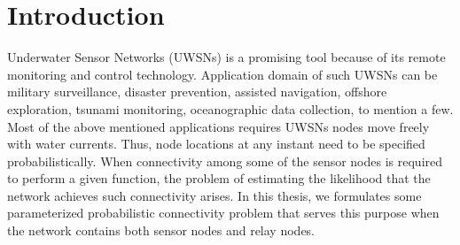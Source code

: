 \documentclass[12pt]{article}
\begin{document}
\newcommand {\nwline}   {\hfill\break}
\newcommand {\closeup}  {\vspace*{-0.2in}}
\newcommand {\hLine}[1] {\begin{center}\rule{#1}{0.25mm}\end{center}}

\newcommand {\ol}[1]    {\overline{#1}}
\newcommand{\Prob}[1]   { {\bf \mathrm{Prob}} \left[ #1 \right] }
\newcommand{\Var}[1]    { {\bf \mathrm{Var}} \left[ #1 \right] }



\begin{abstract}

\end{abstract}



\section{Introduction}


Underwater Sensor Networks (UWSNs) is a promising tool  because of its remote monitoring and control technology. Application domain of such UWSNs can be military surveillance, disaster prevention, assisted navigation, offshore exploration, tsunami monitoring, oceanographic data collection, to mention a few. Most of the above mentioned applications requires UWSNs nodes move
freely with water currents. Thus, node locations at any instant need to be specified probabilistically. When connectivity among some of the sensor nodes is required to perform a given function, the problem of estimating
the likelihood that the network achieves such connectivity arises. In this thesis, we formulates some parameterized probabilistic connectivity problem that serves this purpose when the network contains both sensor nodes and relay nodes.
\end{document}
